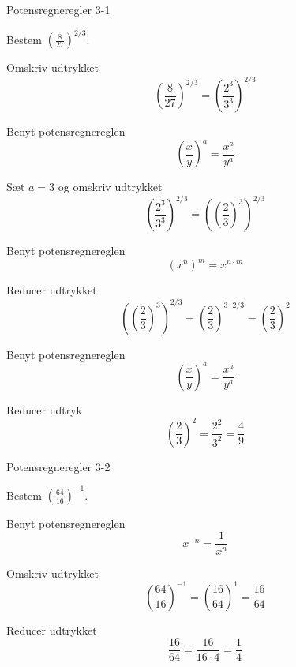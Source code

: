 \documentclass{article}
\begin{document}
\tableofcontents
\newpage

\begin{exercise}{Potensregneregler 3-1}

Bestem $\left(\frac{8}{27}\right)^{2/3}$.


\hint

Omskriv udtrykket
\[
\left(\frac{8}{27}\right)^{2/3} = \left(\frac{2^3}{3^3}\right)^{2/3}
\]

\hint

Benyt potensregnereglen
\[
\left(\frac{x}{y}\right)^a = \frac{x^a}{y^a}
\]

\hint

Sæt $a=3$ og omskriv udtrykket
\[
\left(\frac{2^3}{3^3}\right)^{2/3}  = {\left( \left( \frac{2}{3} \right)^3 \right)}^{2/3} 
\]

\hint

Benyt potensregnereglen
\[
(x^n)^m = x^{n \cdot m}
\]

\hint

Reducer udtrykket
\[
{\left( \left( \frac{2}{3} \right)^3 \right)}^{2/3}  = {\left( \frac{2}{3} \right)}^{ 3 \cdot 2/3}  = {\left(\frac{2}{3}\right)}^2
\]

\hint

Benyt potensregnereglen
\[
\left(\frac{x}{y}\right)^a = \frac{x^a}{y^a}
\]

\hint

Reducer udtryk
\[
{\left(\frac{2}{3}\right)}^2 = \frac{2^2}{3^2}  = \frac{4}{9}
 \]


\end{exercise}

\newpage

\begin{exercise}{Potensregneregler 3-2}
	
	Bestem $\left(\frac{64}{16}\right)^{-1}$.
	
	
	
	\hint
	
	Benyt potensregnereglen
	\[
	x^{-n} = \frac{1}{x^n}
	\]
	
	\hint 
	Omskriv udtrykket
	\[
	\left(\frac{64}{16}\right)^{-1} = \left(\frac{16}{64}\right)^1 = \frac{16}{64}
	\]
	
	\hint
	
	Reducer udtrykket
	\[
	\frac{16}{64} = \frac{16}{16 \cdot 4} = \frac{1}{4}
	\]
	
	
	
\end{exercise}
\end{document}
